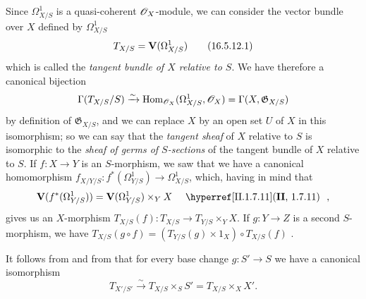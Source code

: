 \begin{env}[16.5.12]
\label{IV.16.5.12}
Since $\Omega_{X/S}^1$ is a quasi-coherent $\mathscr{O}_X$-module, we can consider the vector bundle over $X$ defined by $\Omega_{X/S}^1$ 
\[
  \label{IV.16.5.12.1}
  T_{X/S} = \mathbf{V}(\Omega_{X/S}^1)
  \tag{16.5.12.1}
\]
which is called the \emph{tangent bundle of $X$ relative to $S$}.
We have therefore a canonical bijection 
\[
  \Gamma(T_{X/S}/S) \xrightarrow{\sim} \operatorname{Hom}_{\mathscr{O}_X}(\Omega_{X/S}^1, \mathscr{O}_X) = \Gamma(X, \mathfrak{G}_{X/S})
\]
by definition of $\mathfrak{G}_{X/S}$, and we can replace $X$ by an open set $U$ of $X$ in this isomorphism;
so we can say that the \emph{tangent sheaf} of $X$ relative to $S$ is isomorphic to the \emph{sheaf of germs of $S$-sections} of the tangent bundle of $X$ relative to $S$.
If $f:X \to Y$ is an $S$-morphism, we saw  that we have a canonical homomorphism $f_{X/Y/S}:f^*(\Omega_{Y/S}^1) \to \Omega_{X/S}^1$, which, having in mind that
\[
  \bb{V}(f^*(\Omega_{Y/S}^1)) = \bb{V}(\Omega_{Y/S}^1) \times_Y X \quad \text{\sref[II]{II.1.7.11} },
\]
gives us an $X$-morphism $T_{X/S}(f): T_{X/S} \to T_{Y/S} \times_Y X$.
If $g:Y \to Z$ is a second $S$-morphism, we have $T_{X/S}(g \circ f) = (T_{Y/S}(g) \times 1_X ) \circ T_{X/S}(f)$ .

It follows from  and from  that for every base change $g:S' \to S$ we have a canonical isomorphism
\[
  \label{IV.16.5.12.2}
  T_{X'/S'} \xrightarrow{\sim} T_{X/S} \times_S S' = T_{X/S} \times_X X'.
  \tag{16.5.12.2}
\]
\end{env}

